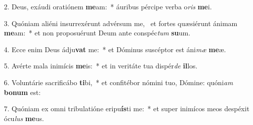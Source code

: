 2. Deus, exáudi oratiónem \textbf{me}am:~*  áuribus pércipe verba o\textit{ris} \textbf{me}i.\

3. Quóniam aliéni insurrexérunt advérsum me, \dag\  et fortes quæsiérunt ánimam \textbf{me}am:~*  et non proposuérunt Deum ante conspéc\textit{tum} \textbf{su}um.\

4. Ecce enim Deus ádju\textbf{vat} me:~*  et Dóminus suscéptor est áni\textit{mæ} \textbf{me}æ.\

5. Avérte mala inimícis \textbf{me}is:~*  et in veritáte tua dispér\textit{de} \textbf{il}los.\

6. Voluntárie sacrificábo \textbf{ti}bi,~*  et confitébor nómini tuo, Dómine: quóni\textit{am} \textbf{bo}\textbf{num} est:\

7. Quóniam ex omni tribulatióne eripu\textbf{ís}ti me:~*  et super inimícos meos despéxit ócu\textit{lus} \textbf{me}us.\


